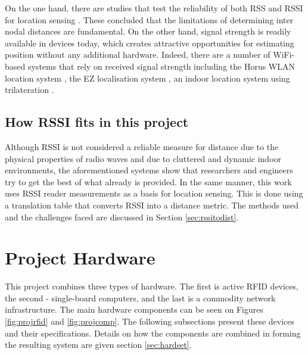 On the one hand, there are studies that test the reliability of both RSS and RSSI for location sensing \cite{Elnahrawy2004, Parameswaran2009}. These concluded that the limitations of determining inter nodal distances are fundamental. On the other hand, signal strength is readily available in devices today, which creates attractive opportunities for estimating position without any additional hardware. Indeed, there are a number of WiFi-based systems that rely on received signal strength including the Horus WLAN location system \cite{Youssef2005}, the EZ localisation system \cite{Chintalapudi2010}, an indoor location system using trilateration \cite{Cook2005}.

\subsection{How RSSI fits in this project}

Although RSSI is not considered a reliable measure for distance due to the physical properties of radio waves and due to cluttered and dynamic indoor environments, the aforementioned systems show that researchers and engineers try to get the best of what already is provided. In the same manner, this work uses RSSI reader measurements as a basis for location sensing. This is done using a translation table that converts RSSI into a distance metric. The methods used and the challenges faced are discussed in Section \ref{sec:rssitodist}.

\section{Project Hardware}
\label{sec:projhard}

This project combines three types of hardware. The first is active RFID devices, the second - single-board computers, and the last is a commodity network infrastructure. The main hardware components can be seen on Figures \ref{fig:projrfid} and \ref{fig:projcomp}. The following subsections present these devices and their specifications. Details on how the components are combined in forming the resulting system are given section \ref{sec:hardset}. 

